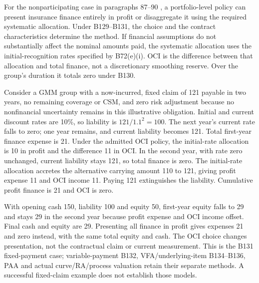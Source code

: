 For the nonparticipating case in paragraphs 87--90 \citep[IFRS~17.87--91 and B128--132]{eu20231803}, a portfolio-level policy can present insurance finance entirely in profit or disaggregate it using the required systematic allocation. Under B129--B131, the choice and the contract characteristics determine the method. If financial assumptions do not substantially affect the nominal amounts paid, the systematic allocation uses the initial-recognition rates specified by B72(e)(i). OCI is the difference between that allocation and total finance, not a discretionary smoothing reserve. Over the group's duration it totals zero under B130.

Consider a GMM group with a now-incurred, fixed claim of 121 payable in two years, no remaining coverage or CSM, and zero risk adjustment because no nonfinancial uncertainty remains in this illustrative obligation. Initial and current discount rates are 10\%, so liability is \(121/1.1^2=100\). The next year's current rate falls to zero; one year remains, and current liability becomes 121. Total first-year finance expense is 21. Under the admitted OCI policy, the initial-rate allocation is 10 in profit and the difference 11 in OCI. In the second year, with rate zero unchanged, current liability stays 121, so total finance is zero. The initial-rate allocation accretes the alternative carrying amount 110 to 121, giving profit expense 11 and OCI income 11. Paying 121 extinguishes the liability. Cumulative profit finance is 21 and OCI is zero.

With opening cash 150, liability 100 and equity 50, first-year equity falls to 29 and stays 29 in the second year because profit expense and OCI income offset. Final cash and equity are 29. Presenting all finance in profit gives expenses 21 and zero instead, with the same total equity and cash. The OCI choice changes presentation, not the contractual claim or current measurement. This is the B131 fixed-payment case; variable-payment B132, VFA/underlying-item B134--B136, PAA and actual curve/RA/process valuation retain their separate methods. A successful fixed-claim example does not establish those models.
